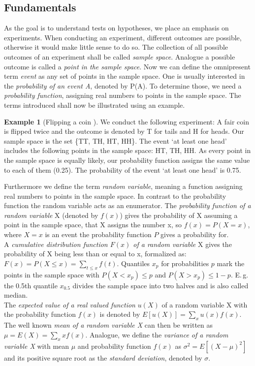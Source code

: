 \documentclass{article}
\theoremstyle{definition}
\newtheorem*{example}{Example}
\begin{document}
\subsection{Fundamentals}
As the goal is to understand tests on hypotheses, we place an emphasis on experiments.
When conducting an experiment, different outcomes are possible, otherwise it would make little sense to do so.
The collection of all possible outcomes of an experiment shall be called \emph{sample space}.
Analogue a possible outcome is called a \emph{point in the sample space}.
Now we can define the omnipresent term \emph{event} as any set of points in the sample space.
One is usually interested in the \emph{probability of an event A}, denoted by P(A).
To determine those, we need a \emph{probability function}, assigning real numbers to points in the sample space.
The terms introduced shall now be illustrated using an example.
\begin{example}[Flipping a coin \cite{conover1980practical}]
	We conduct the following experiment:
	A fair coin is flipped twice and the outcome is denoted by T for tails and H for heads.
	Our sample space is the set \{TT, TH, HT, HH\}.
	The event `at least one head' includes the following points in the sample space: HT, TH, HH.
	As every point in the sample space is equally likely, our probability function assigns the same value to each of them (0.25).
	The probability of the event `at least one head' is 0.75.
\end{example}
Furthermore we define the term \emph{random variable}, meaning a function assigning real numbers to points in the sample space.
In contrast to the probability function the random variable acts as an enumerator.
The \emph{probability function of a random variable} X (denoted by $f(x)$) gives the probability of X assuming a point in the sample space, that X assigns the number x, so $f(x) = P(X = x)$, where $X = x$ is an event the probability function $P$ gives a probability for.
\\
A \emph{cumulative distribution function $F(x)$ of a random variable} X gives the probability of X being less than or equal to x, formalized as: $F(x) = P(X \leq x) = \sum_{t\leq x}f(t)$.
Quantiles $x_p$ for probabilities $p$ mark the points in the sample space with $P(X<x_p)\leq p$ and $P(X>x_p)\leq 1-p$.
E.\,g. the 0.5th quantile $x_{0.5}$ divides the sample space into two halves and is also called median.
\\
The \emph{expected value of a real valued function} $u(X)$ of a random variable X with the probability function $f(x)$ is denoted by $E[u(X)] = \sum_{x}u(x)f(x)$.
\\
The well known \emph{mean of a random variable X} can then be written as $\mu = E(X) = \sum_{x}xf(x)$.
Analogue, we define the \emph{variance of a random variable X} with mean $\mu$ and probability function $f(x)$ as $\sigma^2 = E[(X-\mu)^2]$ and its positive square root as the \emph{standard deviation}, denoted by $\sigma$.
\end{document}
